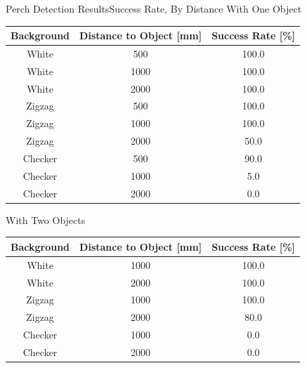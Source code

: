 \documentclass{beamer}
\begin{document}
\begin{frame}{Perch Detection Results}{Success Rate, By Distance}
    \centering
    With One Object
    \begin{table}[H]
        \centering
        \tiny
        \begin{tabular}{|c|c||c|}
            \hline
            Background & Distance to Object [mm] & Success Rate [\%] \\
            \hline
            White & 500 & 100.0 \\
            White & 1000 & 100.0 \\
            White & 2000 & 100.0 \\
            Zigzag & 500 & 100.0 \\
            Zigzag & 1000 & 100.0 \\
            Zigzag & 2000 & 50.0 \\
            Checker & 500 & 90.0 \\
            Checker & 1000 & 5.0 \\
            Checker & 2000 & 0.0 \\
            \hline
        \end{tabular}
    \end{table}

    With Two Objects
    \begin{table}[H]
        \centering
        \tiny
        \begin{tabular}{|c|c||c|}
            \hline
            Background & Distance to Object [mm] & Success Rate [\%] \\
            \hline
            White & 1000 & 100.0 \\
            White & 2000 & 100.0 \\
            Zigzag & 1000 & 100.0 \\
            Zigzag & 2000 & 80.0 \\
            Checker & 1000 & 0.0 \\
            Checker & 2000 & 0.0 \\
            \hline
        \end{tabular}
    \end{table}

\end{frame}        
\end{document}
